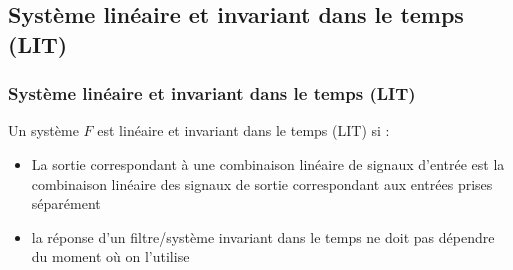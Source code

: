 \documentclass{beamer}
\begin{document}
\subsection{Système linéaire et invariant dans le  temps (LIT)}

\begin{frame}
\frametitle{Système linéaire et invariant dans le  temps (LIT) }

Un système $F$ est linéaire et invariant dans le temps (LIT) si :
\vspace{0.3cm}
\begin{itemize}
\item La sortie correspondant à une combinaison linéaire de signaux d'entrée est la combinaison linéaire des signaux de sortie correspondant aux entrées prises séparément\\
\vspace{0.3cm}
\item la réponse d'un filtre/système invariant dans le temps ne doit pas dépendre du moment où on l'utilise\\
\end{itemize}

\end{frame} 
\end{document}
